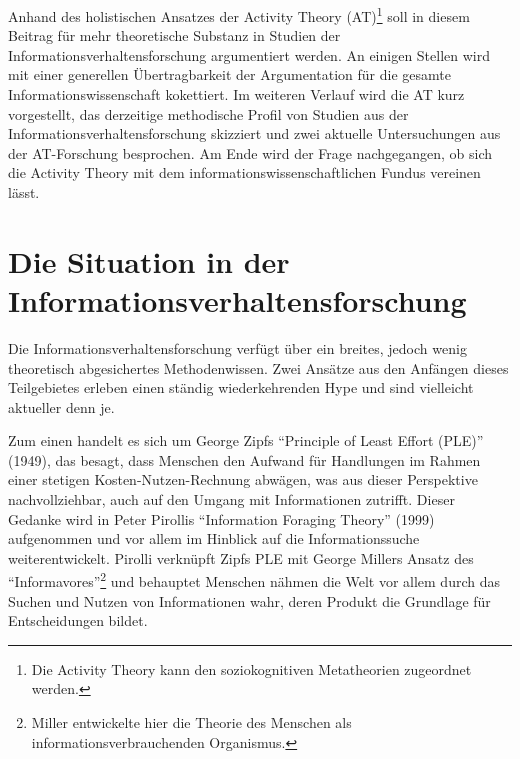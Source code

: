 \documentclass[a4paper,
fontsize=11pt,
oneside,
numbers=noperiodatend,
parskip=half-,
bibliography=totoc,
final
]{scrartcl}
\begin{document}
Anhand des holistischen Ansatzes der Activity Theory (AT)\footnote{Die
  Activity Theory kann den soziokognitiven Metatheorien zugeordnet
  werden.} soll in diesem Beitrag für mehr theoretische Substanz in
Studien der Informationsverhaltensforschung argumentiert werden. An
einigen Stellen wird mit einer generellen Übertragbarkeit der
Argumentation für die gesamte Informationswissenschaft kokettiert. Im
weiteren Verlauf wird die AT kurz vorgestellt, das derzeitige
methodische Profil von Studien aus der Informationsverhaltensforschung
skizziert und zwei aktuelle Untersuchungen aus der AT-Forschung
besprochen. Am Ende wird der Frage nachgegangen, ob sich die Activity
Theory mit dem informationswissenschaftlichen Fundus vereinen lässt.

\section*{Die Situation in der
Informationsverhaltensforschung}\label{die-situation-in-der-informationsverhaltensforschung}

Die Informationsverhaltensforschung verfügt über ein breites, jedoch
wenig theoretisch abgesichertes Methodenwissen. Zwei Ansätze aus den
Anfängen dieses Teilgebietes erleben einen ständig wiederkehrenden Hype
und sind vielleicht aktueller denn je.

Zum einen handelt es sich um George Zipfs \enquote{Principle of Least
Effort (PLE)} (1949), das besagt, dass Menschen den Aufwand für
Handlungen im Rahmen einer stetigen Kosten-Nutzen-Rechnung abwägen, was
aus dieser Perspektive nachvollziehbar, auch auf den Umgang mit
Informationen zutrifft. Dieser Gedanke wird in Peter Pirollis
\enquote{Information Foraging Theory} (1999) aufgenommen und vor allem
im Hinblick auf die Informationssuche weiterentwickelt. Pirolli
verknüpft Zipfs PLE mit George Millers Ansatz des
\enquote{Informavores}\footnote{Miller entwickelte hier die Theorie des
  Menschen als informationsverbrauchenden Organismus.} und behauptet
Menschen nähmen die Welt vor allem durch das Suchen und Nutzen von
Informationen wahr, deren Produkt die Grundlage für Entscheidungen
bildet.
\end{document}
